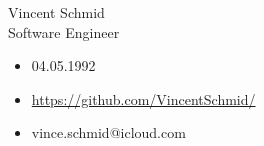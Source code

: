 {\sectionfont\fontsize{30}{30}\selectfont
Vincent Schmid \\
}
{\sectionfont\fontsize{14}{14}\selectfont\color{altColor}
Software Engineer
}
\begin{itemize}
    \item 04.05.1992
    \item \href{https://github.com/VincentSchmid/}{https://github.com/VincentSchmid/}
    \item vince.schmid@icloud.com
\end{itemize}
